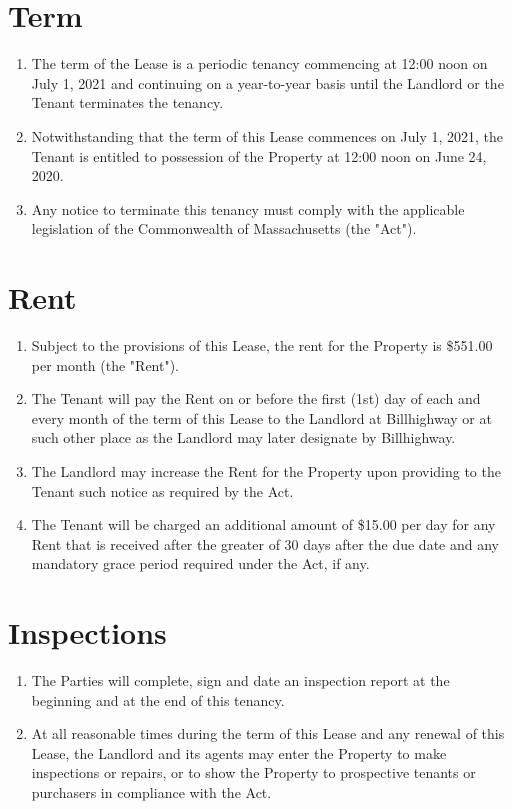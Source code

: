 \documentclass[12pt]{article}
\begin{document}
    
\section*{Term}

\begin{enumerate}[resume]
    \item The term of the Lease is a periodic tenancy commencing at 12:00 noon
	    on July 1, 2021 and continuing on a year-to-year basis until the
		Landlord or the Tenant terminates the tenancy.
    \item Notwithstanding that the term of this Lease commences on July 1,
	    2021, the Tenant is entitled to possession of the Property at 12:00
		noon on June 24, 2020.
   \item  Any notice to terminate this tenancy must comply with the applicable
	   legislation of the Commonwealth of Massachusetts (the "Act").
\end{enumerate}
   
\section*{Rent}

\begin{enumerate}[resume]
    \item Subject to the provisions of this Lease, the rent for the Property is
	    \$551.00 per month (the "Rent").
    \item The Tenant will pay the Rent on or before the first (1st) day of each
	    and every month of the term of this Lease to the Landlord at
		Billhighway or at such other place as the Landlord may later
		designate by Billhighway.
    \item The Landlord may increase the Rent for the Property upon providing to
	    the Tenant such notice as required by the Act.
    \item The Tenant will be charged an additional amount of \$15.00 per day
	    for any Rent that is received after the greater of 30 days after
		the due date and any mandatory grace period required under the
		Act, if any.
\end{enumerate}
    
\section*{Inspections}

\begin{enumerate}[resume]
    \item The Parties will complete, sign and date an inspection report at the
	    beginning and at the end of this tenancy.
    \item At all reasonable times during the term of this Lease and any renewal
	    of this Lease, the Landlord and its agents may enter the Property
		to make inspections or repairs, or to show the Property to
		prospective tenants or purchasers in compliance with the Act.
\end{enumerate}
    
\end{document}
